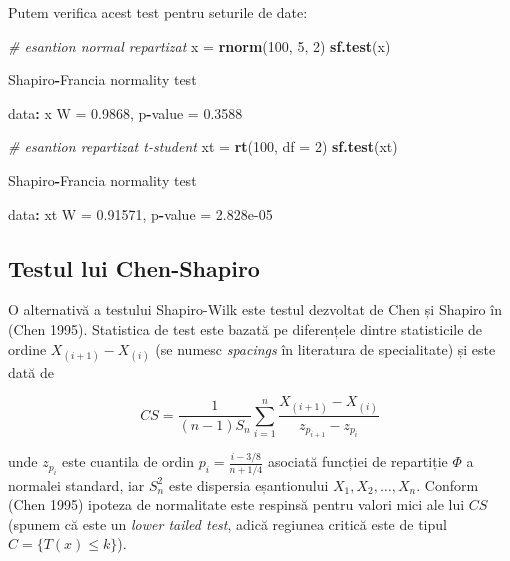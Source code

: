 \documentclass[]{article}
\newenvironment{Shaded}{\begin{snugshade}}{\end{snugshade}}
\newcommand{\KeywordTok}[1]{\textcolor[rgb]{0.13,0.29,0.53}{\textbf{#1}}}
\newcommand{\DataTypeTok}[1]{\textcolor[rgb]{0.13,0.29,0.53}{#1}}
\newcommand{\DecValTok}[1]{\textcolor[rgb]{0.00,0.00,0.81}{#1}}
\newcommand{\FloatTok}[1]{\textcolor[rgb]{0.00,0.00,0.81}{#1}}
\newcommand{\StringTok}[1]{\textcolor[rgb]{0.31,0.60,0.02}{#1}}
\newcommand{\CommentTok}[1]{\textcolor[rgb]{0.56,0.35,0.01}{\textit{#1}}}
\newcommand{\OperatorTok}[1]{\textcolor[rgb]{0.81,0.36,0.00}{\textbf{#1}}}
\newcommand{\NormalTok}[1]{#1}
\begin{document}
Putem verifica acest test pentru seturile de date:

\begin{Shaded}
\begin{Highlighting}[]
\CommentTok{# esantion normal repartizat }
\NormalTok{x =}\StringTok{ }\KeywordTok{rnorm}\NormalTok{(}\DecValTok{100}\NormalTok{, }\DecValTok{5}\NormalTok{, }\DecValTok{2}\NormalTok{)}
\KeywordTok{sf.test}\NormalTok{(x)}

\NormalTok{    Shapiro}\OperatorTok{-}\NormalTok{Francia normality test}

\NormalTok{data}\OperatorTok{:}\StringTok{  }\NormalTok{x}
\NormalTok{W =}\StringTok{ }\FloatTok{0.9868}\NormalTok{, p}\OperatorTok{-}\NormalTok{value =}\StringTok{ }\FloatTok{0.3588}

\CommentTok{# esantion repartizat t-student}
\NormalTok{xt =}\StringTok{ }\KeywordTok{rt}\NormalTok{(}\DecValTok{100}\NormalTok{, }\DataTypeTok{df =} \DecValTok{2}\NormalTok{)}
\KeywordTok{sf.test}\NormalTok{(xt)}

\NormalTok{    Shapiro}\OperatorTok{-}\NormalTok{Francia normality test}

\NormalTok{data}\OperatorTok{:}\StringTok{  }\NormalTok{xt}
\NormalTok{W =}\StringTok{ }\FloatTok{0.91571}\NormalTok{, p}\OperatorTok{-}\NormalTok{value =}\StringTok{ }\FloatTok{2.828e-05}
\end{Highlighting}
\end{Shaded}

\subsection{Testul lui Chen-Shapiro}\label{testul-lui-chen-shapiro}

O alternativă a testului Shapiro-Wilk este testul dezvoltat de Chen și
Shapiro în (Chen 1995). Statistica de test este bazată pe diferențele
dintre statisticile de ordine \(X_{(i+1)} - X_{(i)}\) (se numesc
\emph{spacings} în literatura de specialitate) și este dată de

\[
  CS = \frac{1}{(n-1)S_n}\sum_{i = 1}^{n}\frac{X_{(i+1)} - X_{(i)}}{z_{p_{i+1}} - z_{p_i}}
\]

unde \(z_{p_i}\) este cuantila de ordin
\(p_i = \frac{i - 3/8}{n + 1/4}\) asociată funcției de repartiție
\(\Phi\) a normalei standard, iar \(S_n^2\) este dispersia eșantionului
\(X_1, X_2, \ldots, X_n\). Conform (Chen 1995) ipoteza de normalitate
este respinsă pentru valori mici ale lui \(CS\) (spunem că este un
\emph{lower tailed test}, adică regiunea critică este de tipul
\(C = \{T(x)\leq k\}\)).
\end{document}
